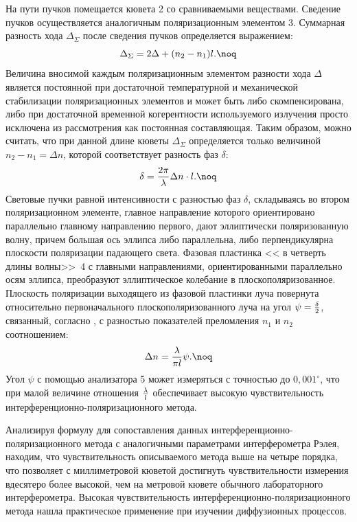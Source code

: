  \vskip 2mm На пути пучков помещается
кювета 2 со сравниваемыми веществами. Сведение пучков
осуществляется аналогичным поляризационным элементом 3. Суммарная
разность хода $\Delta_{\Sigma}$ после сведения пучков определяется
выражением:
$$\Delta_{\Sigma}=2\Delta+(n_2-n_1)l.\noq$$
Величина вносимой каждым поляризационным элементом разности хода
$\Delta$ является постоянной при достаточной температурной и
механической стабилизации поляризационных элементов и может быть
либо скомпенсирована, либо при достаточной временной когерентности
используемого излучения просто исключена из рассмотрения как
постоянная составляющая. Таким образом, можно считать, что при
данной длине кюветы $\Delta_{\Sigma}$ определяется только
величиной $n_2-n_1=\Delta n$, которой соответствует разность фаз
$\delta$:
$$\delta={2\pi\over\lambda}\Delta n\cdot l.\noq$$
Световые пучки равной интенсивности с разностью фаз $\delta$,
складываясь во втором поляризационном элементе, главное
направление которого ориентировано параллельно главному
направлению первого, дают эллиптически поляризованную волну,
причем большая ось эллипса либо параллельна, либо перпендикулярна
плоскости поляризации падающего света. Фазовая пластинка << в
четверть длины волны>>\ 4 с главными направлениями,
ориентированными параллельно осям эллипса, преобразуют
эллиптическое колебание в плоскополяризованное. Плоскость
поляризации выходящего из фазовой пластинки луча повернута
относительно первоначального плоскополяризованного луча на угол
$\psi={\delta\over2}$, связанный, согласно , с разностью
показателей преломления $n_1$ и $n_2$ соотношением:
$$\Delta n={\lambda\over\pi l}\psi.\noq$$
Угол $\psi$ с помощью анализатора 5 может измеряться с точностью
до $0,001^{\circ}$, что при малой величине отношения
${\lambda\over l}$ обеспечивает высокую чувствительность
интерференционно-поляризационного метода.

Анализируя формулу  для сопоставления данных
интерференционно-поляризационного метода с аналогичными
параметрами интерферометра Рэлея, находим, что чувствительность
описываемого метода выше на четыре порядка, что позволяет с
миллиметровой кюветой достигнуть чувствительности измерения
вдесятеро более высокой, чем на метровой кювете обычного
лабораторного интерферометра. Высокая чувствительность
интерференционно-поляризационного метода нашла практическое
применение при изучении диффузионных процессов.

